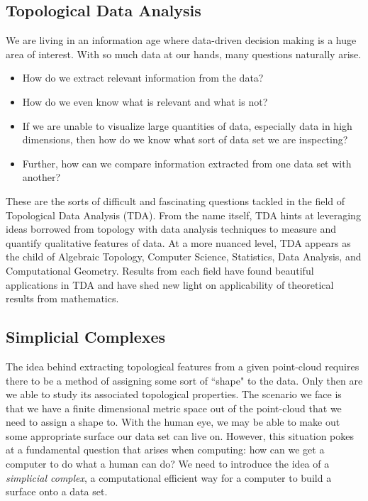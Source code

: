 \documentclass[letterpaper,titlepage]{article}
\begin{document}
\subsection{Topological Data Analysis}
    We are living in an information age where data-driven decision making is a huge area of interest. With so much data at our hands, many questions naturally arise.
    \begin{itemize}
        \item How do we extract relevant information from the data? \item How do we even know what is relevant and what is not? 
        \item If we are unable to visualize large quantities of data, especially data in high dimensions, then how do we know what sort of data set we are inspecting? 
        \item Further, how can we compare information extracted from one data set with another?
    \end{itemize}
    These are the sorts of difficult and fascinating questions tackled in the field of Topological Data Analysis (TDA). From the name itself, TDA hints at leveraging ideas borrowed from topology with data analysis techniques to measure and quantify qualitative features of data. At a more nuanced level, TDA appears as the child of Algebraic Topology, Computer Science, Statistics, Data Analysis, and Computational Geometry. Results from each field have found beautiful applications in TDA and have shed new light on applicability of theoretical results from mathematics.
    
    
\subsection{Simplicial Complexes}
    The idea behind extracting topological features from a given point-cloud requires there to be a method of assigning some sort of ``shape" to the data. Only then are we able to study its associated topological properties. The scenario we face is that we have a finite dimensional metric space out of the point-cloud that we need to assign a shape to. With the human eye, we may be able to make out some appropriate surface our data set can live on. However, this situation pokes at a fundamental question that arises when computing: how can we get a computer to do what a human can do? We need to introduce the idea of a \textit{simplicial complex}, a computational efficient way for a computer to build a surface onto a data set.
    
\end{document}

